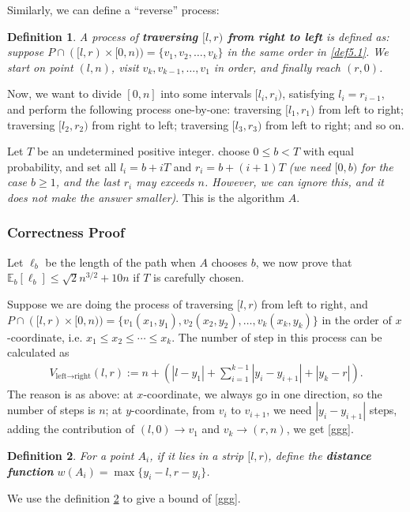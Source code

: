 \documentclass[11pt]{article}
\theoremstyle{plain}
\newtheorem{definition}{Definition}[section]
\begin{document}
Similarly, we can define a ``reverse'' process:
\begin{definition}
A process of \textbf{traversing $[l,r)$ from right to left} is defined as: suppose $P\cap ([l,r)\times [0,n))=\{v_1,v_2,\ldots,v_k\}$ in the same order in \ref{def5.1}. We start on point $(l,n)$, visit $v_k,v_{k-1},\ldots,v_1$ in order, and finally reach $(r,0)$.
\end{definition}

Now, we want to divide $[0,n]$ into some intervals $[l_i,r_i)$, satisfying $l_i=r_{i-1}$, and perform the following process one-by-one: traversing $[l_1,r_1)$ from left to right; traversing $[l_2,r_2)$ from right to left; traversing $[l_3,r_3)$ from left to right; and so on. 

Let $T$ be an undetermined positive integer.  choose $0\le b<T$ with equal probability, and set all $l_i=b+iT$ and $r_i=b+(i+1)T$ \textit{(we need $[0,b)$ for the case $b\ge 1$, and the last $r_i$ may exceeds $n$. However, we can ignore this, and it does not make the answer smaller)}. This is the algorithm $A$. 

\subsubsection{Correctness Proof}

Let $\ell_b$ be the length of the path when $A$ chooses $b$, we now prove that $\mathbb{E}_b[\ell_b]\le \sqrt{2}n^{3/2}+10n$ if $T$ is carefully chosen.

Suppose we are doing the process of traversing $[l,r)$ from left to right, and $P\cap ([l,r)\times [0,n))=\{v_1(x_1,y_1),v_2(x_2,y_2),\ldots,v_k(x_k,y_k)\}$ in the order of $x$-coordinate, i.e. $x_1\le x_2\le \cdots\le x_k$. The number of step in this process can be calculated as
\begin{align}
V_{\text{left}\to \text{right}}(l,r):=n+\left(|l-y_1|+\sum\limits_{i=1}^{k-1} |y_{i}-y_{i+1}|+|y_k-r|\right). \label{ggg}
\end{align}
The reason is as above: at $x$-coordinate, we always go in one direction, so the number of steps is $n$; at $y$-coordinate, from $v_i$ to $v_{i+1}$, we need $|y_i-y_{i+1}|$ steps, adding the contribution of $(l,0)\to v_1$ and $v_k\to (r,n)$, we get \eqref{ggg}.

\begin{definition}
\label{def5.3}
For a point $A_i$, if it lies in a strip $[l,r)$, define the \textbf{distance function} $w(A_i)=\max\{y_i-l,r-y_i\}$.
\end{definition}
We use the definition \ref{def5.3} to give a bound of \eqref{ggg}.
\end{document}
